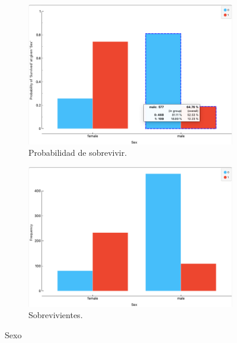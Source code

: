 \begin{figure}[ht]
	\begin{subfigure}{.5\textwidth}
		\includegraphics[scale=0.3]{images/4}
		\centering 
		\caption{Probabilidad de sobrevivir.}
	\end{subfigure}
	\begin{subfigure}{.5\textwidth}
		\includegraphics[scale=0.3]{images/5}
		\centering 
		\caption{Sobrevivientes.}
	\end{subfigure}
	\caption{Sexo}
\end{figure}

